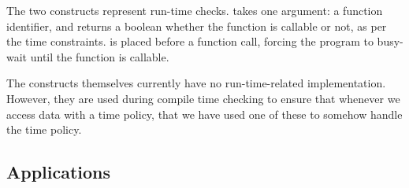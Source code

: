 The two constructs represent run-time checks.
 takes one argument: a function identifier, and returns a boolean whether the function is callable or not, as per the time constraints.
 is placed before a function call, forcing the program to busy-wait until the function is callable.

The constructs themselves currently have no run-time-related implementation.
However, they are used during compile time checking to ensure that whenever we access data with a time policy, that we have used one of these to somehow handle the time policy.

\subsection{Applications}
